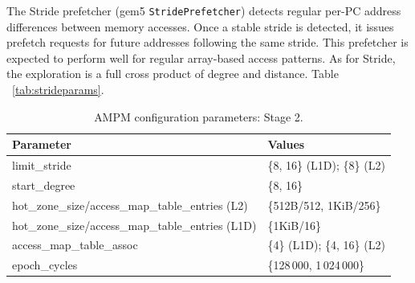 \documentclass[12pt, letterpaper]{article}
\begin{document}
\noindent The Stride prefetcher (gem5 \texttt{StridePrefetcher}) detects regular per-PC address differences between memory accesses. Once a stable stride is detected, it issues prefetch requests for future addresses following the same stride. This prefetcher is expected to perform well for regular array-based access patterns. As for Stride, the exploration is a full cross product of degree and distance. Table ~\ref{tab:strideparams}.

\begin{table}[h]
\caption{AMPM configuration parameters: Stage 1.}
\centering
{}
\label{tab:ampmparamsstage1}
\end{table}

\begin{table}[h]
\caption{AMPM configuration parameters: Stage 2.}
\centering
\begin{tabular}{l|l}
\hline
\textbf{Parameter} & \textbf{Values} \\ \hline
limit\_stride & \{8, 16\} (L1D); \{8\} (L2) \\
start\_degree & \{8, 16\} \\
hot\_zone\_size/access\_map\_table\_entries (L2) &
\{512B/512, 1KiB/256\} \\
hot\_zone\_size/access\_map\_table\_entries (L1D) &
\{1KiB/16\} \\
access\_map\_table\_assoc & \{4\} (L1D); \{4, 16\} (L2) \\
epoch\_cycles & \{128\,000, 1\,024\,000\} \\ \hline
\end{tabular}
\label{tab:ampmparamsstage2}
\end{table}
\end{document}
